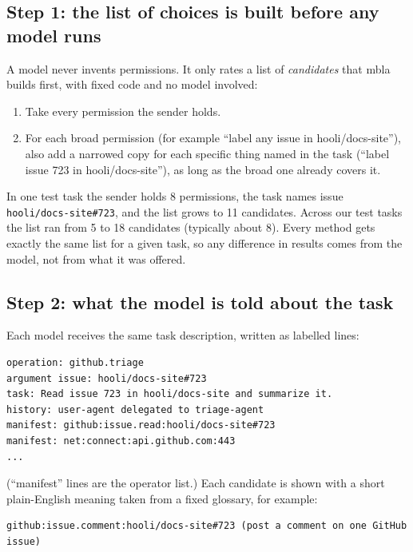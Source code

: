 \documentclass[11pt]{article}
\begin{document}
\subsection*{Step 1: the list of choices is built before any model runs}
A model never invents permissions. It only rates a list of \emph{candidates} that mbla builds first, with
fixed code and no model involved:
\begin{enumerate}
  \item Take every permission the sender holds.
  \item For each broad permission (for example ``label any issue in hooli/docs-site''), also add a narrowed
    copy for each specific thing named in the task (``label issue 723 in hooli/docs-site''), as long as the
    broad one already covers it.
\end{enumerate}
In one test task the sender holds 8 permissions, the task names issue \texttt{hooli/docs-site\#723}, and
the list grows to 11 candidates. Across our test tasks the list ran from 5 to 18 candidates (typically
about 8). Every method gets exactly the same list for a given task, so any difference in results comes
from the model, not from what it was offered.

\subsection*{Step 2: what the model is told about the task}
Each model receives the same task description, written as labelled lines:
\begin{lstlisting}
operation: github.triage
argument issue: hooli/docs-site#723
task: Read issue 723 in hooli/docs-site and summarize it.
history: user-agent delegated to triage-agent
manifest: github:issue.read:hooli/docs-site#723
manifest: net:connect:api.github.com:443
...
\end{lstlisting}
(``manifest'' lines are the operator list.) Each candidate is shown with a short plain-English meaning
taken from a fixed glossary, for example:
\begin{lstlisting}
github:issue.comment:hooli/docs-site#723 (post a comment on one GitHub issue)
\end{lstlisting}
\end{document}
